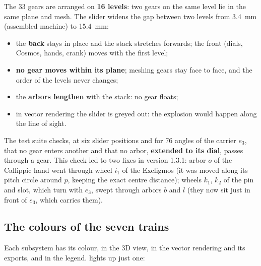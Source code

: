 The 33 gears are arranged on \textbf{16 levels}: two gears on the same level lie in the same
plane and mesh. The  slider widens the gap between two levels from
3.4~mm (assembled machine) to 15.4~mm:
\begin{itemize}
  \item the \textbf{back} stays in place and the stack stretches forwards; the front (dials,
        Cosmos, hands, crank) moves with the first level;
  \item \textbf{no gear moves within its plane}; meshing gears stay face to face, and the
        order of the levels never changes;
  \item the \textbf{arbors lengthen} with the stack: no gear floats;
  \item in vector rendering the slider is greyed out: the explosion would happen along the
        line of sight.
\end{itemize}

\begin{info}
The test suite checks, at six slider positions and for 76 angles of the carrier $e_3$, that
no gear enters another and that no arbor, \textbf{extended to its dial}, passes through a gear.
This check led to two fixes in version 1.3.1: arbor $o$ of the Callippic hand went through
wheel $i_1$ of the Exeligmos (it was moved along its pitch circle around $p$, keeping the
exact centre distance); wheels $k_1$, $k_2$ of the pin and slot, which turn with $e_3$, swept
through arbors $b$ and $l$ (they now sit just in front of $e_3$, which carries them).
\end{info}


\subsection{The colours of the seven trains}

Each subsystem has its colour, in the 3D view, in the vector rendering and its exports, and in
the legend.  lights up just one:


